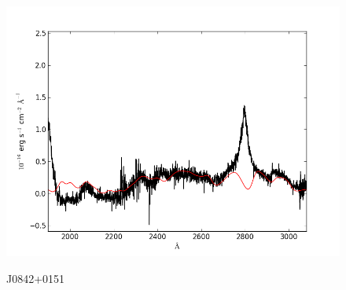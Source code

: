 \documentclass[usenatbib]{mn2e}
\begin{document}
\begin{figure}
\begin{center}
\vspace{5mm}
\includegraphics[width=0.49\linewidth,angle=0]{./red/fe_fit_SBB_5.png}\\

\end{center} 
\caption{J0842+0151 \label{fig:landscape}}   
\end{figure}

\newpage
\end{document}
